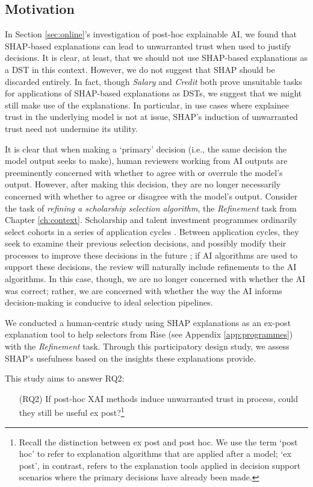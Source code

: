 \subsection{Motivation}
In Section \ref{sec:online}'s investigation of post-hoc explainable AI, we found that SHAP-based explanations can lead to unwarranted trust when used to justify decisions. It is clear, at least, that we should not use SHAP-based explanations as a DST in this context. However, we do not suggest that SHAP should be discarded entirely. In fact, though \emph{Salary} and \emph{Credit} both prove unsuitable tasks for applications of SHAP-based explanations as DSTs, we suggest that we might still make use of the explanations. In particular, in use cases where explainee trust in the underlying model is not at issue, SHAP's induction of unwarranted trust need not undermine its utility.

It is clear that when making a `primary' decision (i.e., the same decision the model output seeks to make), human reviewers working from AI outputs are preeminently concerned with whether to agree with or overrule the model's output. However, after making this decision, they are no longer necessarily concerned with whether to agree or disagree with the model's output. Consider the task of \emph{refining a scholarship selection algorithm}, the \emph{Refinement} task from Chapter \ref{ch:context}. Scholarship and talent investment programmes ordinarily select cohorts in a series of application cycles \cite{li2020hiring}. Between application cycles, they seek to examine their previous selection decisions, and possibly modify their processes to improve these decisions in the future \cite{li2020hiring}; if AI algorithms are used to support these decisions, the review will naturally include refinements to the AI algorithms. In this case, though, we are no longer concerned with whether the AI was correct; rather, we are concerned with whether the way the AI informs decision-making is conducive to ideal selection pipelines.

We conducted a human-centric study using SHAP explanations as an ex-post explanation tool to help selectors from Rise (see Appendix \ref{app:programmes}) with the \emph{Refinement} task. Through this participatory design study, we assess SHAP's usefulness based on the insights these explanations provide.

This study aims to answer RQ2:

\begin{enumerate}
    \item[(RQ2)] If post-hoc XAI methods induce unwarranted trust in process, could they still be useful ex post?\footnote{Recall the distinction between ex post and post hoc. We use the term `post hoc' to refer to explanation algorithms that are applied after a model; `ex post', in contrast, refers to the explanation tools applied in decision support scenarios where the primary decisions have already been made.}
\end{enumerate}

